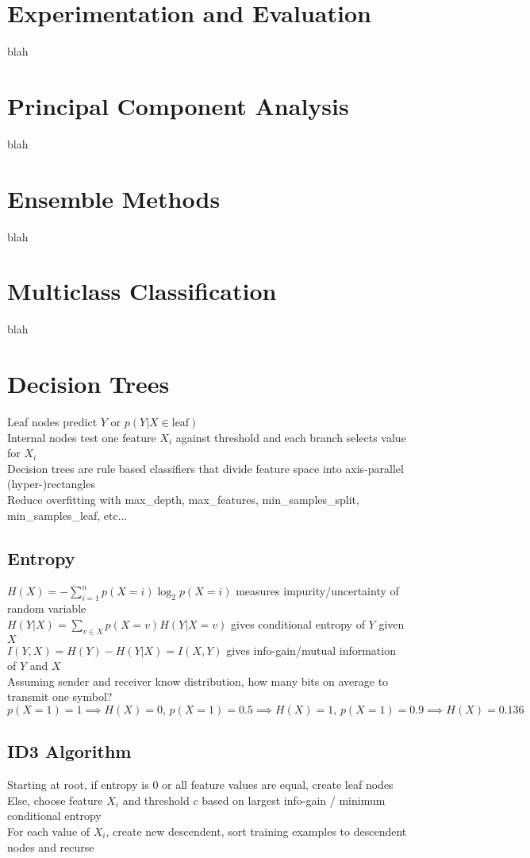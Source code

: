 \documentclass{article}
\begin{document}
\section{Experimentation and Evaluation}
blah

\section{Principal Component Analysis}
blah

\section{Ensemble Methods}
blah

\section{Multiclass Classification}
blah

\section{Decision Trees}
Leaf nodes predict $Y$ or $p(Y|X \in \mbox{leaf})$ \\ 
Internal nodes test one feature $X_i$ against threshold and each branch selects value for $X_i$ \\
Decision trees are rule based classifiers that divide feature space into axis-parallel (hyper-)rectangles \\
Reduce overfitting with max\_depth, max\_features, min\_samples\_split, min\_samples\_leaf, etc...

\subsection{Entropy}
$H(X) = -\sum \limits_{i=1}^n p(X = i)\log_2 p(X=i)$ measures impurity/uncertainty of random variable \\
$H(Y| X) = \sum \limits_{v \in X}p(X = v)H(Y | X = v)$ gives conditional entropy of $Y$ given $X$ \\
$I(Y, X) = H(Y) - H(Y|X) = I(X, Y)$ gives info-gain/mutual information of $Y$ and $X$ \\
Assuming sender and receiver know distribution, how many bits on average to transmit one symbol? \\
${p(X = 1) = 1 \implies H(X) = 0\mbox{, } p(X = 1) = 0.5 \implies H(X) = 1\mbox{, } p(X = 1) = 0.9 \implies H(X) = 0.136}$ 
\subsection{ID3 Algorithm}
Starting at root, if entropy is 0 or all feature values are equal, create leaf nodes \\
Else, choose feature $X_i$ and threshold $c$ based on largest info-gain / minimum conditional entropy \\
For each value of $X_i$, create new descendent, sort training examples to descendent nodes and recurse
\end{document}
